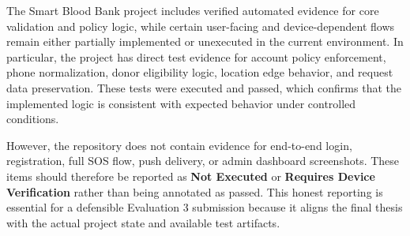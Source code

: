 The Smart Blood Bank project includes verified automated evidence for core validation and policy logic, while certain user-facing and device-dependent flows remain either partially implemented or unexecuted in the current environment. In particular, the project has direct test evidence for account policy enforcement, phone normalization, donor eligibility logic, location edge behavior, and request data preservation. These tests were executed and passed, which confirms that the implemented logic is consistent with expected behavior under controlled conditions.

However, the repository does not contain evidence for end-to-end login, registration, full SOS flow, push delivery, or admin dashboard screenshots. These items should therefore be reported as \textbf{Not Executed} or \textbf{Requires Device Verification} rather than being annotated as passed. This honest reporting is essential for a defensible Evaluation 3 submission because it aligns the final thesis with the actual project state and available test artifacts.

